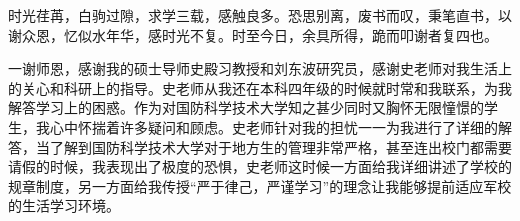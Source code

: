 

\begin{ack}
\par 时光荏苒，白驹过隙，求学三载，感触良多。恐思别离，废书而叹，秉笔直书，以谢众恩，忆似水年华，感时光不复。时至今日，余具所得，跪而叩谢者复四也。
\par 一谢师恩，感谢我的硕士导师史殿习教授和刘东波研究员，感谢史老师对我生活上的关心和科研上的指导。史老师从我还在本科四年级的时候就时常和我联系，为我解答学习上的困惑。作为对国防科学技术大学知之甚少同时又胸怀无限憧憬的学生，我心中怀揣着许多疑问和顾虑。史老师针对我的担忧一一为我进行了详细的解答，当了解到国防科学技术大学对于地方生的管理非常严格，甚至连出校门都需要请假的时候，我表现出了极度的恐惧，史老师这时候一方面给我详细讲述了学校的规章制度，另一方面给我传授“严于律己，严谨学习”的理念让我能够提前适应军校的生活学习环境。

\end{ack}
